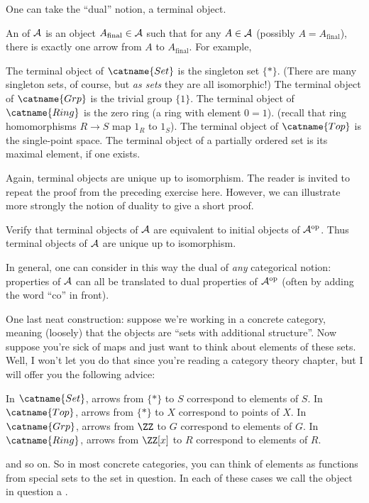 \documentclass[11pt]{scrreprt}
\begin{document}
One can take the ``dual'' notion, a terminal object.
\begin{example}
	An  of $\AA$ is an object
	$A_{\text{final}} \in \AA$ such that for any $A \in \AA$ (possibly $A = A_{\text{final}}$),
	there is exactly one arrow from $A$ to $A_{\text{final}}$.
	For example,
	\begin{enumerate}[(a)]
		\ii The terminal object of $\catname{Set}$ is the singleton set $\{\ast\}$.
		(There are many singleton sets, of course, but \emph{as sets} they are all isomorphic!)
		\ii The terminal object of $\catname{Grp}$ is the trivial group $\{1\}$.
		\ii The terminal object of $\catname{Ring}$ is the zero ring (a ring with element $0=1$).
		(recall that ring homomorphisms $R \to S$ map $1_R$ to $1_S$).
		\ii The terminal object of $\catname{Top}$ is the single-point space.
		\ii The terminal object of a partially ordered set is its maximal element, if one exists.
	\end{enumerate}
\end{example}

Again, terminal objects are unique up to isomorphism.
The reader is invited to repeat the proof from the preceding exercise here.
However, we can illustrate more strongly the notion of duality to give a short proof.
\begin{ques}
	Verify that terminal objects of $\AA$ are equivalent to initial objects of $\AA^{\text{op}}$.
	Thus terminal objects of $\AA$ are unique up to isomorphism.
\end{ques}
In general, one can consider in this way the dual of \emph{any} categorical notion:
properties of $\AA$ can all be translated to dual properties of $\AA^{\text{op}}$
(often by adding the word ``co'' in front).

One last neat construction: suppose we're working in a concrete category,
meaning (loosely) that the objects are ``sets with additional structure''.
Now suppose you're sick of maps and just want to think about elements of these sets.
Well, I won't let you do that since you're reading a category theory chapter,
but I will offer you the following advice:
\begin{itemize}
	\ii In $\catname{Set}$, arrows from $\{\ast\}$ to $S$ correspond to elements of $S$.
	\ii In $\catname{Top}$, arrows from $\{\ast\}$ to $X$ correspond to points of $X$.
	\ii In $\catname{Grp}$, arrows from $\ZZ$ to $G$ correspond to elements of $G$.
	\ii In $\catname{Ring}$, arrows from $\ZZ[x]$ to $R$ correspond to elements of $R$.
\end{itemize}
and so on.
So in most concrete categories, you can think of elements as functions from special sets to the set in question.
In each of these cases we call the object in question a .
\end{document}

